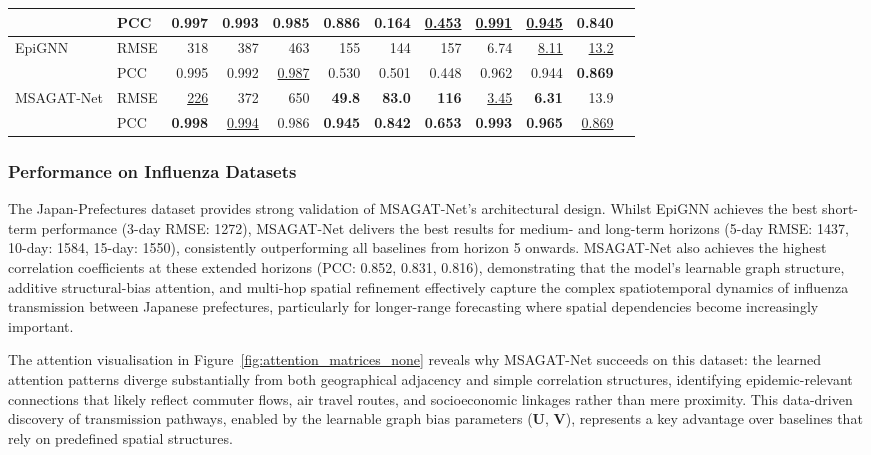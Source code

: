 \documentclass[a4paper,fleqn]{cas-dc}
\begin{document}
\begin{table}[!ht]
{\begin{tabular}{llrrrrrrrrrr}
                    & PCC  & 0.997 & 0.993 & 0.985 & 0.886 & 0.164 & \underline{0.453} & \underline{0.991} & \underline{0.945} & 0.840 \\
        \midrule
        EpiGNN      & RMSE & 318 & 387 & 463 & 155 & 144 & 157 & 6.74 & \underline{8.11} & \underline{13.2} \\
                    & PCC  & 0.995 & 0.992 & \underline{0.987} & 0.530 & 0.501 & 0.448 & 0.962 & 0.944 & \textbf{0.869} \\
        \midrule
        MSAGAT-Net & RMSE & \underline{226} & 372 & 650 & \textbf{49.8} & \textbf{83.0} & \textbf{116} & \underline{3.45} & \textbf{6.31} & 13.9 \\
                    & PCC  & \textbf{0.998} & \underline{0.994} & 0.986 & \textbf{0.945} & \textbf{0.842} & \textbf{0.653} & \textbf{0.993} & \textbf{0.965} & \underline{0.869} \\
        \bottomrule
    \end{tabular}%
    }
\end{table}

\subsubsection{Performance on Influenza Datasets}

The Japan-Prefectures dataset provides strong validation of MSAGAT-Net's architectural design. Whilst EpiGNN achieves the best short-term performance (3-day RMSE: 1272), MSAGAT-Net delivers the best results for medium- and long-term horizons (5-day RMSE: 1437, 10-day: 1584, 15-day: 1550), consistently outperforming all baselines from horizon 5 onwards. MSAGAT-Net also achieves the highest correlation coefficients at these extended horizons (PCC: 0.852, 0.831, 0.816), demonstrating that the model's learnable graph structure, additive structural-bias attention, and multi-hop spatial refinement effectively capture the complex spatiotemporal dynamics of influenza transmission between Japanese prefectures, particularly for longer-range forecasting where spatial dependencies become increasingly important.

The attention visualisation in Figure~\ref{fig:attention_matrices_none} reveals why MSAGAT-Net succeeds on this dataset: the learned attention patterns diverge substantially from both geographical adjacency and simple correlation structures, identifying epidemic-relevant connections that likely reflect commuter flows, air travel routes, and socioeconomic linkages rather than mere proximity. This data-driven discovery of transmission pathways, enabled by the learnable graph bias parameters ($\mathbf{U}$, $\mathbf{V}$), represents a key advantage over baselines that rely on predefined spatial structures.
\end{document}
